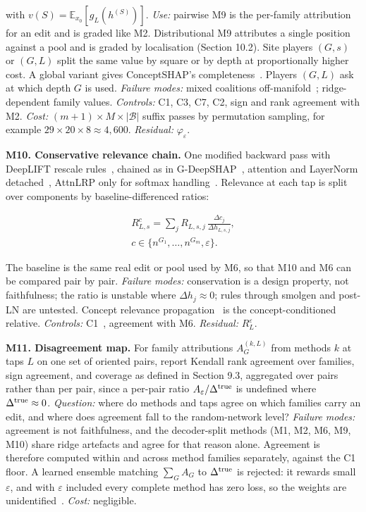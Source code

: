\documentclass[conference]{IEEEtran}
\begin{document}
with $v(S)=\mathbb E_{x_0}[g_L(h^{(S)})]$. \emph{Use:} pairwise M9 is the per-family attribution for an edit and is graded like M2. Distributional M9 attributes a single position against a pool and is graded by localisation (Section 10.2). Site players $(G,s)$ or $(G,L)$ split the same value by square or by depth at proportionally higher cost. A global variant gives ConceptSHAP's completeness~\cite{yeh2020}. Players $(G,L)$ ask at which depth $G$ is used. \emph{Failure modes:} mixed coalitions off-manifold~\cite{kumarIE2020}; ridge-dependent family values. \emph{Controls:} C1, C3, C7, C2, sign and rank agreement with M2. \emph{Cost:} $(m+1)\times M\times|\mathcal B|$ suffix passes by permutation sampling, for example $29\times20\times8\approx4{,}600$. \emph{Residual:} $\varphi_\varepsilon$.

\textbf{M10. Conservative relevance chain.} One modified backward pass with DeepLIFT rescale rules~\cite{shrikumar2017}, chained as in G-DeepSHAP~\cite{chen2022}, attention and LayerNorm detached~\cite{ali2022}, AttnLRP only for softmax handling~\cite{achtibat2024}. Relevance at each tap is split over components by baseline-differenced ratios:

\[
\begin{gathered}R^c_{L,s}=\sum_j R_{L,s,j}\,\frac{\Delta c_j}{\Delta h_{L,s,j}},\\
c\in\{n^{G_1},\dots,n^{G_m},\varepsilon\}.\end{gathered}
\]

The baseline is the same real edit or pool used by M6, so that M10 and M6 can be compared pair by pair. \emph{Failure modes:} conservation is a design property, not faithfulness; the ratio is unstable where $\Delta h_j\approx0$; rules through smolgen and post-LN are untested. Concept relevance propagation~\cite{achtibat2023} is the concept-conditioned relative. \emph{Controls:} C1~\cite{adebayo2018}, agreement with M6. \emph{Residual:} $R^\varepsilon_L$.

\textbf{M11. Disagreement map.} For family attributions $A^{(k,L)}_G$ from methods $k$ at taps $L$ on one set of oriented pairs, report Kendall rank agreement over families, sign agreement, and coverage as defined in Section 9.3, aggregated over pairs rather than per pair, since a per-pair ratio $A_\varepsilon/\Delta^{\rm true}$ is undefined where $\Delta^{\rm true}\approx0$. \emph{Question:} where do methods and taps agree on which families carry an edit, and where does agreement fall to the random-network level? \emph{Failure modes:} agreement is not faithfulness, and the decoder-split methods (M1, M2, M6, M9, M10) share ridge artefacts and agree for that reason alone. Agreement is therefore computed within and across method families separately, against the C1 floor. A learned ensemble matching $\sum_GA_G$ to $\Delta^{\rm true}$ is rejected: it rewards small $\varepsilon$, and with $\varepsilon$ included every complete method has zero loss, so the weights are unidentified~\cite{he2025}. \emph{Cost:} negligible.
\end{document}
